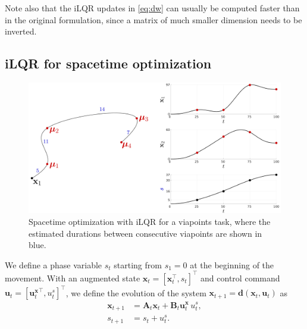 \documentclass[10pt,a4paper]{article} %
\newcommand{\trsp}{{\scriptscriptstyle\top}}
\begin{document}
Note also that the iLQR updates in \eqref{eq:dw} can usually be computed faster than in the original formulation, since a matrix of much smaller dimension needs to be inverted. 


\subsection{iLQR for spacetime optimization}


\begin{figure}
\centering
\includegraphics[width=.50\textwidth]{images/iLQR_spacetime01.png}
\caption{\footnotesize
Spacetime optimization with iLQR for a viapoints task, where the estimated durations between consecutive viapoints are shown in blue. 
}
\label{fig:iLQR_spacetime}
\vspace{-60pt}
\end{figure}

We define a phase variable $s_t$ starting from $s_1=0$ at the beginning of the movement.
With an augmented state $\bm{x}_t={[\mathbf{x}_t^\trsp, s_t]}^\trsp$ and control command $\bm{u}_t={[{\bm{u}^{\mathbf{x}}_t}^\trsp, u^s_t]}^\trsp$, we define the evolution of the system $\bm{x}_{t+1}=\bm{d}(\bm{x}_t,\bm{u}_t)$ as
\begin{align*}
	\mathbf{x}_{t+1} &= \mathbf{A}_t \mathbf{x}_t + \mathbf{B}_t \bm{u}^{\mathbf{x}}_t \, u^s_t,\\
	s_{t+1} &= s_t + u^s_t. %
\end{align*}
\end{document}
